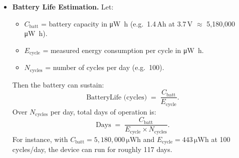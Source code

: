 \documentclass[A4,10pt]{article}
\begin{document}
\begin{itemize}

  \item \textbf{Battery Life Estimation.}  
  Let:
  \begin{itemize}
    \item $C_\mathrm{batt}$ = battery capacity in \si{\micro\watt\hour} (e.g.\ 1.4\,Ah at 3.7\,V $\approx$ 5{,}180{,}000\,\si{\micro\watt\hour}).
    \item $E_\mathrm{cycle}$ = measured energy consumption per cycle in \si{\micro\watt\hour}.
    \item $N_\mathrm{cycles}$ = number of cycles per day (e.g.\ 100).
  \end{itemize}
  Then the battery can sustain:
  \[
    \text{BatteryLife (cycles)} \;=\; \frac{C_{\mathrm{batt}}}{E_{\mathrm{cycle}}}.
  \]
  Over $N_\mathrm{cycles}$ per day, total days of operation is:
  \[
    \text{Days} \;=\; \frac{C_{\mathrm{batt}}}{E_{\mathrm{cycle}} \times N_{\mathrm{cycles}}}.
  \]
  For instance, with $C_{\mathrm{batt}}=5{,}180{,}000\,\si{\micro\watt\hour}$ and $E_{\mathrm{cycle}}=443\,\si{\micro\watt\hour}$ at 100 cycles/day, the device can run for roughly 117 days.
\end{itemize}
\end{document}
